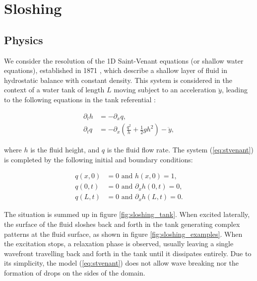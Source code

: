 \chapter{Sloshing}

\section{Physics}

We consider the resolution of the 1D Saint-Venant equations (or shallow water equations), established in 1871 \cite{saintvenant1871}, which describe a shallow layer of fluid in hydrostatic balance with constant density. This system is considered in the context of a water tank of length $L$ moving subject to an acceleration $\ddot{y}$, leading to the following equations in the tank referential \cite{berger2022}:

\begin{equation}
\label{eq:stvenant}
\begin{split}
	\partial_t h 	&= -\partial_x q, \\
	\partial_t q		&= -\partial_x \left( \frac{q^2}{h} + \frac{1}{2} g h^2 \right) - \ddot{y},
\end{split}
\end{equation}

where $h$ is the fluid height, and $q$ is the fluid flow rate. The system (\ref{eq:stvenant}) is completed by the following initial and boundary conditions:

\begin{equation}
\label{eq:stvenant_bc}
\begin{split}
	q(x,0)	&= 0 \text{ and } h(x,0)	= 1, \\
	q(0,t) 	&= 0 \text{ and } \partial_x h(0,t) = 0, \\
	q(L,t) 	&= 0 \text{ and } \partial_x h(L,t) = 0.
\end{split}
\end{equation}

The situation is summed up in figure \ref{fig:sloshing_tank}. When excited laterally, the surface of the fluid sloshes back and forth in the tank generating complex patterns at the fluid surface, as shown in figure \ref{fig:sloshing_examples}. When the excitation stops, a relaxation phase is observed, usually leaving a single wavefront travelling back and forth in the tank until it dissipates entirely. Due to its simplicity, the model (\ref{eq:stvenant}) does not allow wave breaking nor the formation of drops on the sides of the domain.

